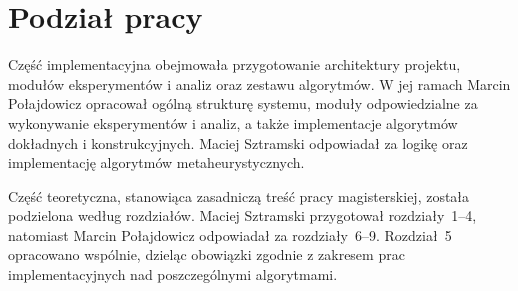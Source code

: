 \chapter*{Podział pracy}

Część implementacyjna obejmowała przygotowanie architektury projektu, modułów eksperymentów i analiz oraz zestawu algorytmów. W jej ramach Marcin Połajdowicz opracował ogólną strukturę systemu, moduły odpowiedzialne za wykonywanie eksperymentów i analiz, a także implementacje algorytmów dokładnych i konstrukcyjnych. Maciej Sztramski odpowiadał za logikę oraz implementację algorytmów metaheurystycznych.

Część teoretyczna, stanowiąca zasadniczą treść pracy magisterskiej, została podzielona według rozdziałów. Maciej Sztramski przygotował rozdziały~1--4, natomiast Marcin Połajdowicz odpowiadał za rozdziały~6--9. Rozdział~5 opracowano wspólnie, dzieląc obowiązki zgodnie z zakresem prac implementacyjnych nad poszczególnymi algorytmami.
